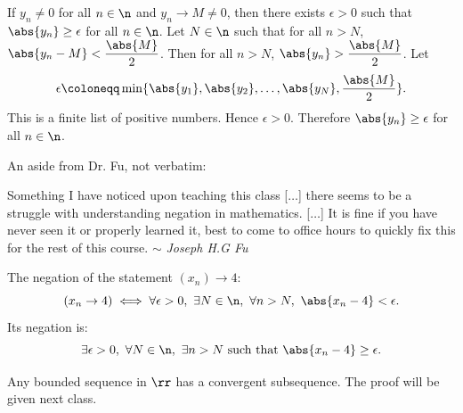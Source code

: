 

\begin{proposition}{
    If $y_n\neq 0$ for all $n\in\n$ and $y_n\to M\neq 0$, then there exists $\epsilon > 0$ such that $\abs{y_n}\geq \epsilon$ for all $n\in\n$.
}
    Let $N\in\n$ such that for all $n > N$, $\abs{y_n - M} < \dfrac{\abs{M}}{2}$.
    Then for all $n > N$, $\abs{y_n} > \dfrac{\abs{M}}{2}$.
    Let
    \[
        \epsilon \coloneqq \min\{\abs{y_1},\abs{y_2},\ldots,\abs{y_N},\dfrac{\abs{M}}{2}\}.
    \]
    This is a finite list of positive numbers.
    Hence $\epsilon > 0$.
    Therefore $\abs{y_n} \geq \epsilon$ for all $n\in\n$.
\end{proposition}

\begin{remark}
    An aside from Dr. Fu, not verbatim:
    \begin{displayquote}
        Something I have noticed upon teaching this class [$\ldots$] there seems to be a struggle with understanding negation in mathematics.
        [$\ldots$] It is fine if you have never seen it or properly learned it, best to come to office hours to quickly fix this for the rest of this course. $\sim$ \textit{Joseph H.G Fu}
    \end{displayquote}
    The negation of the statement $(x_n)\to 4$:
    \[
        (x_n \to 4) \iff \forall \epsilon > 0,\ \exists N\in\n,\ \forall n > N,\ \abs{x_n - 4} < \epsilon.
    \]
    Its negation is:
    \[
        \exists \epsilon > 0,\ \forall N\in\n,\ \exists n > N \text{ such that } \abs{x_n - 4} \geq \epsilon.
    \]
\end{remark}

\begin{theorem}{
    Any bounded sequence in $\rr$ has a convergent subsequence.
}
    The proof will be given next class.
\end{theorem}